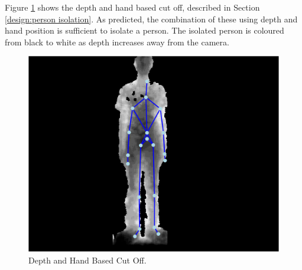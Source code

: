 Figure \ref{fig:depth and hand based cut off} shows the depth and hand based cut off, described in Section \ref{design:person isolation}. As predicted, the combination of these using depth and hand position is sufficient to isolate a person. The isolated person is coloured from black to white as depth increases away from the camera.\\

\begin{figure}[h]
\begin{center}
\includegraphics[scale=0.4]{./design/parse3} 
\end{center}
\caption{Depth and Hand Based Cut Off.}
\label{fig:depth and hand based cut off}
\end{figure} 